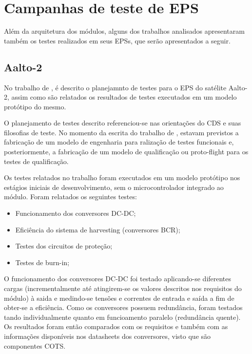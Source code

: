 \section{Campanhas de teste de EPS}\label{sec:testes-epss}

Além da arquitetura dos módulos, alguns dos trabalhos analisados apresentaram também os testes realizados em seus \gls{EPS}s, que serão apresentados a seguir.

\subsection*{Aalto-2}

No trabalho de \textcite{aalto-eps}, é descrito o planejamnto de testes para o EPS do satélite Aalto-2, assim como são relatados os resultados de testes executados em um modelo protótipo do mesmo.

O planejamento de testes descrito referenciou-se nas orientações do \gls{CDS} e suas filosofias de teste.
No momento da escrita do trabalho de \textcite{aalto-eps}, estavam previstos a fabricação de um modelo de engenharia para ralização de testes funcionais e, posteriormente, a fabricação de um modelo de qualificação ou proto-flight para os testes de qualificação.

Os testes relatados no trabalho foram executados em um modelo protótipo nos estágios iniciais de desenvolvimento, sem o microcontrolador integrado ao módulo. Foram relatados os seguintes testes:

\begin{itemize}
    \item Funcionamento dos conversores DC-DC;
    \item Eficiência do sistema de harvesting (conversores \gls{BCR});
    \item Testes dos circuitos de proteção;
    \item Testes de burn-in;
\end{itemize} 

O funcionamento dos conversores DC-DC foi testado aplicando-se diferentes cargas (incrementalmente até atingirem-se os valores descritos nos requisitos do módulo) à saida e medindo-se tensões e correntes de entrada e saída a fim de obter-se a eficiência. Como os conversores possuem redundância, foram testados tando individualmente quanto em funcioamento paralelo (redundância quente).
Os resultados foram então comparados com os requisitos e também com as informações disponíveis nos datasheets dos conversores, visto que são componentes \gls{COTS}.

